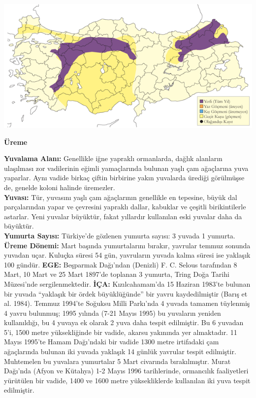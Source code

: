 \documentclass[
  letterpaper,
  DIV=11,
  numbers=noendperiod]{scrreprt}
\begin{document}
\includegraphics{images/harita_Page_088.png}

\textbf{Üreme}

\textbf{Yuvalama Alanı:} Genellikle iğne yapraklı ormanlarda, dağlık
alanların ulaşılması zor vadilerinin eğimli yamaçlarında bulunan yaşlı
çam ağaçlarına yuva yaparlar. Aynı vadide birkaç çiftin birbirine yakın
yuvalarda ürediği görülmüşse de, genelde koloni halinde üremezler.\\
\textbf{Yuvası:} Tür, yuvasını yaşlı çam ağaçlarının genellikle en
tepesine, büyük dal parçalarından yapar ve çevresini yapraklı dallar,
kabuklar ve çeşitli birikintilerle astarlar. Yeni yuvalar büyüktür,
fakat yıllardır kullanılan eski yuvalar daha da büyüktür.\\
\textbf{Yumurta Sayısı:} Türkiye'de gözlenen yumurta sayısı: 3 yuvada 1
yumurta.\\
\textbf{Üreme Dönemi:} Mart başında yumurtalarını bırakır, yavrular
temmuz sonunda yuvadan uçar. Kuluçka süresi 54 gün, yavruların yuvada
kalma süresi ise yaklaşık 100 gündür. \textbf{EGE:} Beşparmak Dağı'ndan
(Denizli) F. C. Selous tarafından 8 Mart, 10 Mart ve 25 Mart 1897'de
toplanan 3 yumurta, Tring Doğa Tarihi Müzesi'nde sergilenmektedir.
\textbf{İÇA:} Kızılcahamam'da 15 Haziran 1983'te bulunan bir yuvada
``yaklaşık bir ördek büyüklüğünde'' bir yavru kaydedilmiştir (Barış et
al. 1984). Temmuz 1994'te Soğuksu Milli Parkı'nda 4 yuvada tamamen
tüylenmiş 4 yavru bulunmuş; 1995 yılında (7-21 Mayıs 1995) bu yuvaların
yeniden kullanıldığı, bu 4 yuvaya ek olarak 2 yuva daha tespit
edilmiştir. Bu 6 yuvadan 5'i, 1500 metre yüksekliğinde bir vadide,
akarsu yakınında yer almaktadır. 11 Mayıs 1995'te Hamam Dağı'ndaki bir
vadide 1300 metre irtifadaki çam ağaçlarında bulunan iki yuvada yaklaşık
14 günlük yavrular tespit edilmiştir. Muhtemelen bu yuvalara yumurtalar
5 Mart civarında bırakılmıştır. Murat Dağı'nda (Afyon ve Kütahya) 1-2
Mayıs 1996 tarihlerinde, ormancılık faaliyetleri yürütülen bir vadide,
1400 ve 1600 metre yüksekliklerde kullanılan iki yuva tespit edilmiştir.
\end{document}
